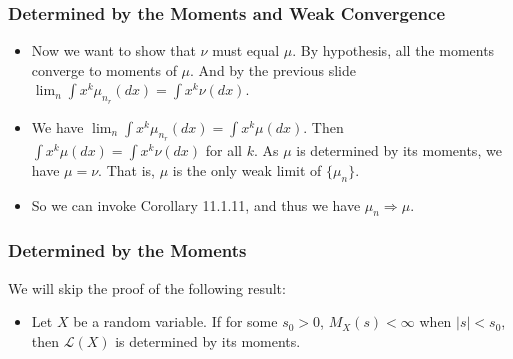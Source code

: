 \documentclass[handout]{beamer}
\newcommand{\BE}{\mathbf{E}}
\begin{document}
 
 
 \frame
{
  \frametitle{Determined by the Moments and Weak Convergence}

 \begin{itemize}

  \item<9-> Now we want to show that $\nu$ must equal $\mu$. By hypothesis, all the moments converge to moments of $\mu$. And by the previous slide $\lim_n \int x^k \mu_{n_r}(dx)=\int x^k \nu(dx)$.

\item<10->  We have $\lim_n \int x^k \mu_{n_r}(dx)=\int x^k \mu(dx)$. Then $\int x^k \mu(dx)=\int x^k \nu(dx)$ for all $k$. As $\mu$ is determined by its moments, we have $\mu=\nu$. That is, $\mu$ is the only weak limit of $\{\mu_n\}$.

\item<11-> So we can invoke Corollary 11.1.11, and thus we have $\mu_n \Rightarrow \mu$.
\end{itemize}
 }
 
 
 \frame
{
  \frametitle{Determined by the Moments}

We will skip the proof of the following result:
 \begin{itemize}

\item<1->[]\begin{Theorem}[11.4.3]Let $X$ be a random variable. If for some $s_0>0$, $M_X(s)<\infty$ when $|s|<s_0$, then $\mathcal{L}(X)$ is determined by its moments. \end{Theorem}

%
\end{itemize}
 }
 
 
 
\end{document}
